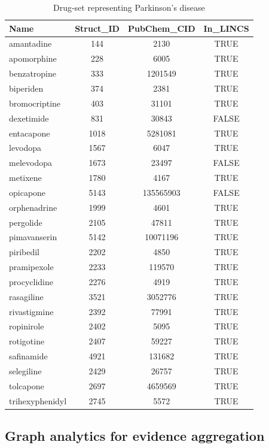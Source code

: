 \begin{table}
\caption{Drug-set representing Parkinson's disease}
\begin{center}
\begin{tabular}{ |l|c|c|c| } 
\hline
\textbf{Name} & \textbf{Struct\_ID} & \textbf{PubChem\_CID} & \textbf{In\_LINCS} \\
\hline
amantadine & 144 & 2130 & TRUE \\
apomorphine & 228 & 6005 & TRUE \\
benzatropine & 333 & 1201549 & TRUE \\
biperiden & 374 & 2381 & TRUE \\
bromocriptine & 403 & 31101 & TRUE \\
dexetimide & 831 & 30843 & FALSE \\
entacapone & 1018 & 5281081 & TRUE \\
levodopa & 1567 & 6047 & TRUE \\
melevodopa & 1673 & 23497 & FALSE \\
metixene & 1780 & 4167 & TRUE \\
opicapone & 5143 & 135565903 & FALSE \\
orphenadrine & 1999 & 4601 & TRUE \\
pergolide & 2105 & 47811 & TRUE \\
pimavanserin & 5142 & 10071196 & TRUE \\
piribedil & 2202 & 4850 & TRUE \\
pramipexole & 2233 & 119570 & TRUE \\
procyclidine & 2276 & 4919 & TRUE \\
rasagiline & 3521 & 3052776 & TRUE \\
rivastigmine & 2392 & 77991 & TRUE \\
ropinirole & 2402 & 5095 & TRUE \\
rotigotine & 2407 & 59227 & TRUE \\
safinamide & 4921 & 131682 & TRUE \\
selegiline & 2429 & 26757 & TRUE \\
tolcapone & 2697 & 4659569 & TRUE \\
trihexyphenidyl & 2745 & 5572 & TRUE \\
\hline
\end{tabular}
\end{center}
\label{table:pd_drugset}
\end{table}

\subsection{Graph analytics for evidence aggregation}

